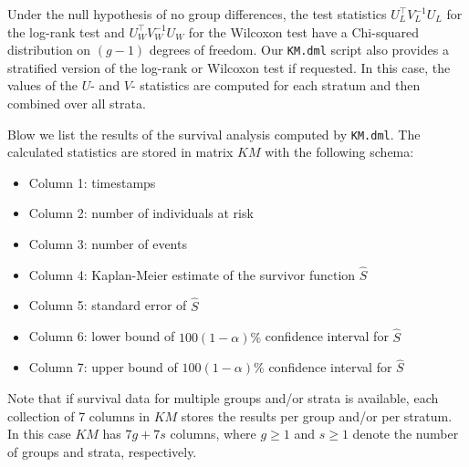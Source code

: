 Under the null hypothesis of no group differences, the test statistics $U_L^\top V_L^{-1} U_L$ for the log-rank test and  $U_W^\top V_W^{-1} U_W$ for the Wilcoxon test have a Chi-squared distribution on $(g-1)$ degrees of freedom.
Our {\tt KM.dml} script also provides a stratified version of the log-rank or Wilcoxon test if requested.
In this case, the values of the $U$- and $V$- statistics are computed for each stratum and then combined over all strata.


\smallskip
{}
\smallskip

  
Blow we list the results of the survival analysis computed by {\tt KM.dml}. 
The calculated statistics are stored in matrix $KM$ with the following schema:
\begin{itemize}
	\item Column 1: timestamps 
	\item Column 2: number of individuals at risk
	\item Column 3: number of events
	\item Column 4: Kaplan-Meier estimate of the survivor function $\hat{S}$ 
	\item Column 5: standard error of $\hat{S}$
	\item Column 6: lower bound of $100(1-\alpha)\%$ confidence interval for $\hat{S}$
	\item Column 7: upper bound of $100(1-\alpha)\%$ confidence interval for $\hat{S}$
\end{itemize}
Note that if survival data for multiple groups and/or strata is available, each collection of 7 columns in $KM$ stores the results per group and/or per stratum. 
In this case $KM$ has $7g+7s$ columns, where $g\geq 1$ and $s\geq 1$ denote the number of groups and strata, respectively. 


